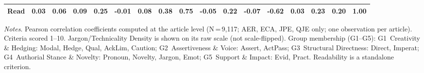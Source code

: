 \begin{table}
\begin{threeparttable}
\begin{tabular}{lrrrrrrrrrrrrrrrr}
Read & 0.03 & 0.06 & 0.09 & 0.25 & -0.01 & 0.08 & 0.38 & 0.75 & -0.05 & 0.22 & -0.07 & -0.62 & 0.03 & 0.23 & 0.20 & 1.00 \\
\bottomrule
\end{tabular}
\begin{tablenotes}
\footnotesize
\item \textit{Notes}. Pearson correlation coefficients computed at the article level (N\,=\,9,117; AER, ECA, JPE, QJE only; one observation per article). Criteria scored 1--10. Jargon/Technicality Density is shown on its raw scale (not scale-flipped). Group membership (G1--G5): G1~Creativity \& Hedging: Modal, Hedge, Qual, AckLim, Caution; G2~Assertiveness \& Voice: Assert, ActPass; G3~Structural Directness: Direct, Imperat; G4~Authorial Stance \& Novelty: Pronoun, Novelty, Jargon, Emot; G5~Support \& Impact: Evid, Pract. Readability is a standalone criterion.
\end{tablenotes}
\end{threeparttable}
\end{table}
